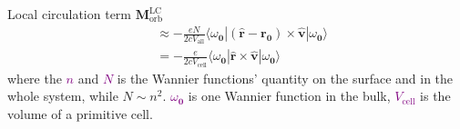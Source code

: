 \documentclass{beamer}
\newcommand{\purple}{\textcolor{purple}}
\begin{document}
\begin{frame}[fragile,t]{Local circulation term \(\bm{M}_{\text{orb}}^{\text{LC}}\)}
\begin{equation}
\begin{aligned}
        &\approx -\frac{eN}{2cV_{\text{all}}}\langle\omega_{\bm{0}}|\left(\widehat{\bm{r}}-\bm{r}_{\bm{0}}\right)\times\widehat{\bm{v}}|\omega_{\bm{0}}\rangle\\
        &= -\frac{e}{2cV_{\text{cell}}}\langle\omega_{\bm{0}}|\widehat{\bm{r}}\times\widehat{\bm{v}}|\omega_{\bm{0}}\rangle
      \end{aligned}\end{equation}
      {\scriptsize where the \purple{\(n\)} and \purple{\(N\)} is the Wannier functions' quantity on the surface and in the whole system, while \(N \sim n^2\).  \purple{\(\omega_{\bm{0}}\)} is one Wannier function in the bulk, \purple{\(V_{\text{cell}}\)} is the volume of a primitive cell.}
    \end{frame}
\end{document}
